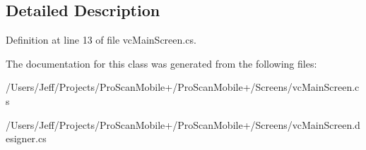\subsection{Detailed Description}


Definition at line 13 of file vc\-Main\-Screen.\-cs.



The documentation for this class was generated from the following files\-:\begin{DoxyCompactItemize}
\item 
/\-Users/\-Jeff/\-Projects/\-Pro\-Scan\-Mobile+/\-Pro\-Scan\-Mobile+/\-Screens/vc\-Main\-Screen.\-cs\item 
/\-Users/\-Jeff/\-Projects/\-Pro\-Scan\-Mobile+/\-Pro\-Scan\-Mobile+/\-Screens/vc\-Main\-Screen.\-designer.\-cs\end{DoxyCompactItemize}
